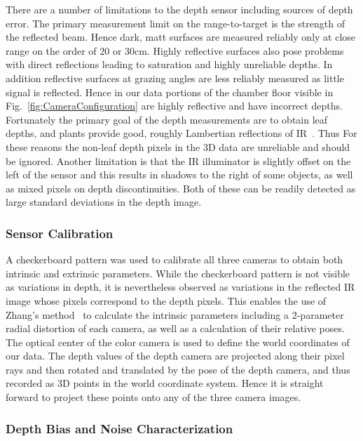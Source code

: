 There are a number of limitations to the depth sensor including sources of depth error.  The primary measurement limit on the range-to-target is the strength of the reflected beam. Hence dark, matt surfaces are measured reliably only at close range on the order of 20 or 30cm.  Highly reflective surfaces also pose problems with direct reflections leading to saturation and highly unreliable depths.  In addition reflective surfaces at grazing angles are less reliably measured as little signal is reflected.  Hence in our data portions of the chamber floor visible in Fig.~\ref{fig:CameraConfiguration} are highly reflective and have incorrect depths.  Fortunately the primary goal of the depth measurements are to obtain leaf depths, and plants provide good, roughly Lambertian reflections of IR~\cite{Chelle2006219}.  Thus For these reasons the non-leaf depth pixels in the 3D data are unreliable and should be ignored.  Another limitation is that the IR illuminator is slightly offset on the left of the sensor and this results in shadows to the right of some objects, as well as mixed pixels on depth discontinuities.  Both of these can be readily detected as large standard deviations in the depth image.

\subsubsection{Sensor Calibration}

A checkerboard pattern was used to calibrate all three cameras to obtain both intrinsic and extrinsic parameters.  While the checkerboard pattern is not visible as variations in depth, it is nevertheless observed as variations in the reflected IR image whose pixels correspond to the depth pixels.  This enables the use of Zhang's method~\cite{Zhang2000} to calculate the intrinsic parameters including a 2-parameter radial distortion of each camera, as well as a calculation of their relative poses.  The optical center of the color camera is used to define the world coordinates of our data.  The depth values of the depth camera are projected along their pixel rays and then rotated and translated by the pose of the depth camera, and thus recorded as 3D points in the world coordinate system.  Hence it is straight forward to project these points onto any of the three camera images.

\subsubsection{Depth Bias and Noise Characterization}
\label{sec:bias}

